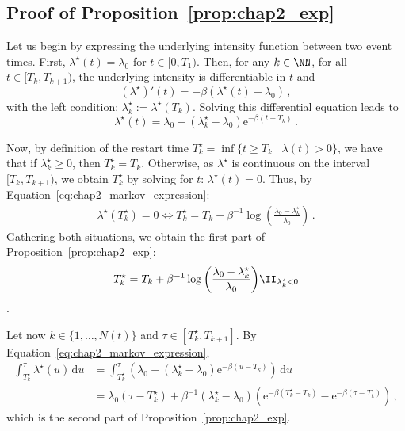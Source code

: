 \begin{subappendices}
\section{Proof of Proposition~\ref{prop:chap2_exp}}
\label{app:chap2_appendix}

Let us begin by expressing the underlying intensity function between two event times.
First, \(\lambda^\star(t) = \lambda_0\) for \(t\in[0,T_1)\).
Then, for any $k\in\NN$, for all $t \in [T_k,T_{k+1})$, the underlying intensity is differentiable in \(t\) and
\begin{equation*}
    (\lambda^\star)'(t) = -\beta(\lambda^\star(t) - \lambda_0)\,,
\end{equation*}
with the left condition: $\lambda_k^\star := \lambda^\star(T_k)$.
Solving this differential equation leads to
\begin{equation}\label{eq:chap2_markov_expression}
    \lambda^\star(t) = \lambda_0 + (\lambda_k^\star - \lambda_0)\mathrm{e}^{-\beta(t - T_k)}\,.
\end{equation}

Now, by definition of the restart time $T_k^\star = \inf{\{t\geq T_k\mid \lambda(t) > 0\}}$, we have that if $\lambda_k^\star \geq 0$, then $T_k^\star = T_k$. Otherwise, as $\lambda^\star$ is continuous on the interval $[T_k,T_{k+1})$, we obtain $T_k^\star$ by solving for $t$: \(\lambda^\star(t) = 0\).
Thus, by Equation~\eqref{eq:chap2_markov_expression}:
\begin{align*}
    \lambda^\star(T_k^\star) = 0
    \iff T_k^\star = T_k + \beta^{-1}\log{\left(\frac{\lambda_0 - \lambda^\star_k}{\lambda_0}\right)}\,.
\end{align*}
Gathering both situations, we obtain the first part of Proposition~\ref{prop:chap2_exp}: \[T_k^\star = T_k + \beta^{-1}\log{\left(\frac{\lambda_0 - \lambda^\star_k}{\lambda_0}\right)} \II_{\lambda_k^\star < 0}\].

Let now $k\in\{1,\ldots,N(t)\}$ and $\tau\in[T_{k}^\star,T_{k+1}]$.
By Equation~\eqref{eq:chap2_markov_expression},
\begin{align*}
    \int_{T_{k}^\star}^{\tau}{\lambda^\star(u)\,\mathrm{d}u}
    &= \int_{T_{k}^\star}^{\tau} \left( \lambda_0 + (\lambda_{k}^\star - \lambda_0)\mathrm{e}^{-\beta(u - T_{k})} \right)\,\mathrm{d}u\\
    &= \lambda_0(\tau - T_{k}^\star) + \beta^{-1}(\lambda_{k}^\star - \lambda_0)(\mathrm{e}^{-\beta(T_{k}^\star-T_{k})}-\mathrm{e}^{-\beta(\tau-T_{k})})\,,
\end{align*}
which is the second part of Proposition~\ref{prop:chap2_exp}.


\end{subappendices}
